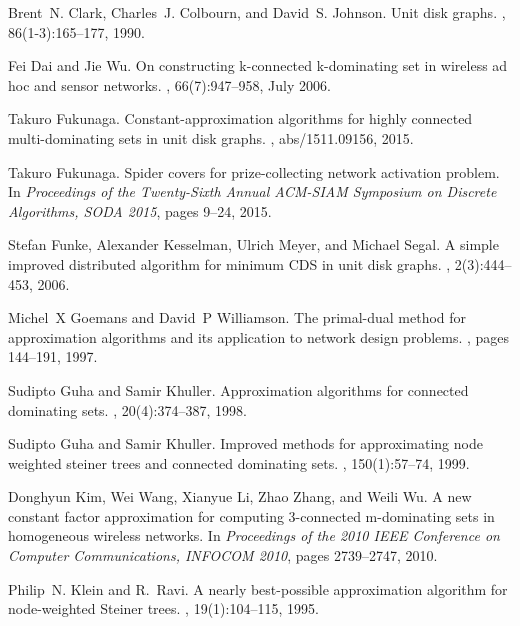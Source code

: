 \documentclass[11pt]{article}
\begin{document}
\begin{thebibliography}{10}
Brent~N. Clark, Charles~J. Colbourn, and David~S. Johnson.
\newblock Unit disk graphs.
, 86(1-3):165--177, 1990.

Fei Dai and Jie Wu.
\newblock On constructing k-connected k-dominating set in wireless ad hoc and
  sensor networks.
, 66(7):947--958,
  July 2006.

Takuro Fukunaga.
\newblock Constant-approximation algorithms for highly connected
  multi-dominating sets in unit disk graphs.
, abs/1511.09156, 2015.

Takuro Fukunaga.
\newblock Spider covers for prize-collecting network activation problem.
\newblock In {\em Proceedings of the Twenty-Sixth Annual {ACM-SIAM} Symposium
  on Discrete Algorithms, {SODA} 2015}, pages 9--24, 2015.

Stefan Funke, Alexander Kesselman, Ulrich Meyer, and Michael Segal.
\newblock A simple improved distributed algorithm for minimum {CDS} in unit
  disk graphs.
, 2(3):444--453, 2006.

Michel~X Goemans and David~P Williamson.
\newblock The primal-dual method for approximation algorithms and its
  application to network design problems.
, pages
  144--191, 1997.

Sudipto Guha and Samir Khuller.
\newblock Approximation algorithms for connected dominating sets.
, 20(4):374--387, 1998.

Sudipto Guha and Samir Khuller.
\newblock Improved methods for approximating node weighted steiner trees and
  connected dominating sets.
, 150(1):57--74, 1999.

Donghyun Kim, Wei Wang, Xianyue Li, Zhao Zhang, and Weili Wu.
\newblock A new constant factor approximation for computing 3-connected
  m-dominating sets in homogeneous wireless networks.
\newblock In {\em Proceedings of the 2010 {IEEE} Conference on Computer
  Communications, {INFOCOM} 2010}, pages 2739--2747, 2010.

Philip~N. Klein and R.~Ravi.
\newblock A nearly best-possible approximation algorithm for node-weighted
  {S}teiner trees.
, 19(1):104--115, 1995.


\end{thebibliography}
\end{document}
